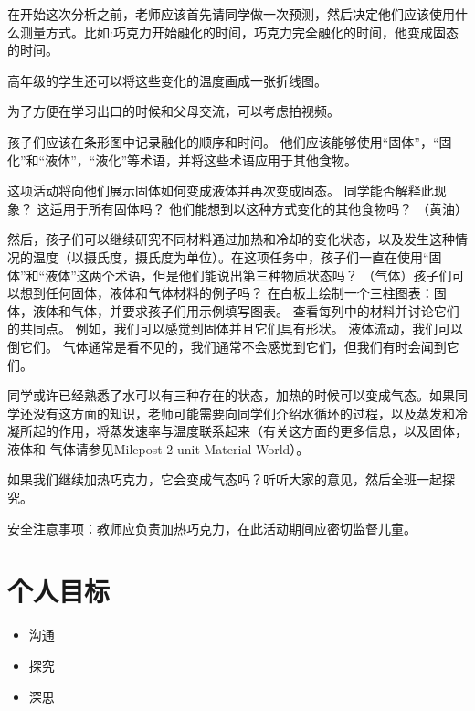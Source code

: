      在开始这次分析之前，老师应该首先请同学做一次预测，然后决定他们应该使用什么测量方式。比如:巧克力开始融化的时间，巧克力完全融化的时间，他变成固态的时间。\par
     高年级的学生还可以将这些变化的温度画成一张折线图。\par
     为了方便在学习出口的时候和父母交流，可以考虑拍视频。\par
     孩子们应该在条形图中记录融化的顺序和时间。 他们应该能够使用“固体”，“固化”和“液体”，“液化”等术语，并将这些术语应用于其他食物。\par
     这项活动将向他们展示固体如何变成液体并再次变成固态。 同学能否解释此现象？ 这适用于所有固体吗？ 他们能想到以这种方式变化的其他食物吗？ （黄油）\par
     然后，孩子们可以继续研究不同材料通过加热和冷却的变化状态，以及发生这种情况的温度（以摄氏度，摄氏度为单位）。在这项任务中，孩子们一直在使用“固体”和“液体”这两个术语，但是他们能说出第三种物质状态吗？ （气体）孩子们可以想到任何固体，液体和气体材料的例子吗？ 在白板上绘制一个三柱图表：固体，液体和气体，并要求孩子们用示例填写图表。 查看每列中的材料并讨论它们的共同点。 例如，我们可以感觉到固体并且它们具有形状。 液体流动，我们可以倒它们。 气体通常是看不见的，我们通常不会感觉到它们，但我们有时会闻到它们。\par
     同学或许已经熟悉了水可以有三种存在的状态，加热的时候可以变成气态。如果同学还没有这方面的知识，老师可能需要向同学们介绍水循环的过程，以及蒸发和冷凝所起的作用，将蒸发速率与温度联系起来（有关这方面的更多信息，以及固体，液体和 气体请参见Milepost 2 unit Material World）。\par
     如果我们继续加热巧克力，它会变成气态吗？听听大家的意见，然后全班一起探究。\par
     安全注意事项：教师应负责加热巧克力，在此活动期间应密切监督儿童。
     
     


\section{个人目标}
    \begin{itemize}
      \item 沟通
      \item 探究
      \item 深思
    \end{itemize}  
